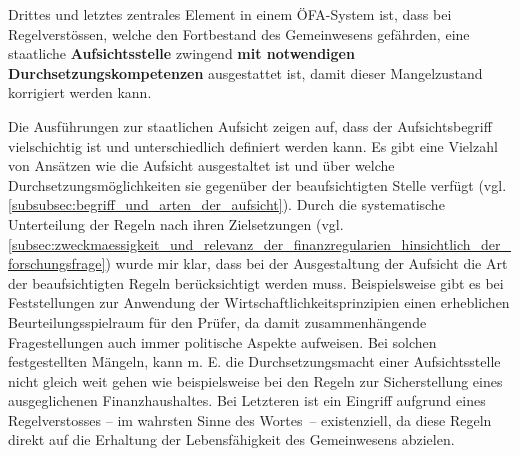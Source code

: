 \documentclass[10pt]{article}
\begin{document}
Drittes und letztes zentrales Element in einem ÖFA-System ist, dass bei Regelverstössen, welche den Fortbestand des Gemeinwesens gefährden, eine staatliche \textbf{Aufsichtsstelle }zwingend \textbf{mit notwendigen Durchsetzungskompetenzen} ausgestattet ist, damit dieser Mangelzustand korrigiert werden kann.

Die Ausführungen zur staatlichen Aufsicht zeigen auf, dass der Aufsichtsbegriff vielschichtig ist und unterschiedlich definiert werden kann. Es gibt eine Vielzahl von Ansätzen wie die Aufsicht ausgestaltet ist und über welche Durchsetzungsmöglichkeiten sie gegenüber der beaufsichtigten Stelle verfügt (vgl. \vref{subsubsec:begriff_und_arten_der_aufsicht}).  Durch die systematische Unterteilung der Regeln nach ihren Zielsetzungen (vgl. \vref{subsec:zweckmaessigkeit_und_relevanz_der_finanzregularien_hinsichtlich_der_forschungsfrage}) wurde mir klar, dass bei der Ausgestaltung der Aufsicht die Art der beaufsichtigten Regeln berücksichtigt werden muss. Beispielsweise gibt es bei Feststel­lungen zur Anwendung der Wirtschaftlichkeitsprinzipien einen erheblichen Beurteilungs­spielraum für den Prüfer, da damit zusammenhängende Fragestellungen auch immer politische Aspekte aufweisen. Bei solchen festgestellten Mängeln, kann m. E. die Durch­setzungsmacht einer Aufsichtsstelle nicht gleich weit gehen wie beispielsweise bei den Regeln zur Sicherstellung eines ausgeglichenen Finanzhaushaltes. Bei Letzteren ist ein Eingriff aufgrund eines Regelverstosses -- im wahrsten Sinne des Wortes~-- existenziell, da diese Regeln direkt auf die Erhaltung der Lebensfähigkeit des Gemeinwesens abzielen.
\end{document}
